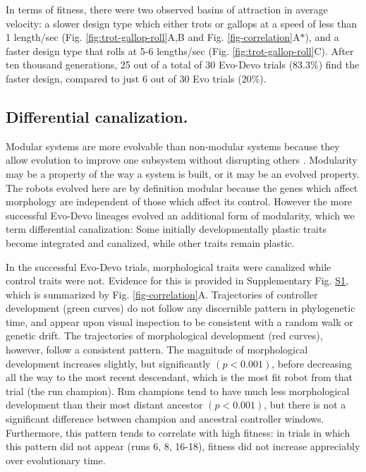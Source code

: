 In terms of fitness, there were two observed basins of attraction in average velocity: a slower design type which either trots or gallops at a speed of less than 1 length/sec (Fig. \ref{fig:trot-gallop-roll}A,B and Fig. \ref{fig-correlation}A{\Large$\ast$}), and a faster design type that rolls at 5-6 lengths/sec (Fig. \ref{fig:trot-gallop-roll}C). 
After ten thousand generations, 25 out of a total of 30 Evo-Devo trials (83.3\%) find the faster design, compared to just 6 out of 30 Evo trials (20\%).


\subsection{Differential canalization.}

Modular systems are more evolvable than non-modular systems because they allow evolution to improve one subsystem without disrupting others \cite{wagner1996perspective,lipson2007principles}.
Modularity may be a property of the way a system is built, or it may be an evolved property.
The robots evolved here are by definition modular because the genes which affect morphology are independent of those which affect its control.
However the more successful Evo-Devo lineages evolved an additional form of modularity, which we term differential canalization:
Some initially developmentally plastic traits become integrated and canalized, while other traits remain plastic.


In the successful Evo-Devo trials, morphological traits were canalized while control traits were not.
Evidence for this is provided in Supplementary Fig. \hyperref[fig:S1]{S1}, which is summarized by Fig. \ref{fig-correlation}A.
Trajectories of controller development (green curves) do not follow any discernible pattern in phylogenetic time, and appear upon visual inspection to be consistent with a random walk or genetic drift.
The trajectories of morphological development (red curves), however, follow a consistent pattern.
The magnitude of morphological development increases slightly, but significantly $(p<0.001)$, before decreasing all the way to the most recent descendant, which is the most fit robot from that trial (the run champion). 
Run champions tend to have much less morphological development than their most distant ancestor $(p<0.001)$, but there is not a significant difference between champion and ancestral controller windows.
Furthermore, this pattern tends to correlate with high fitness: in trials in which this pattern did not appear (runs 6, 8, 16-18), fitness did not increase appreciably over evolutionary time.

